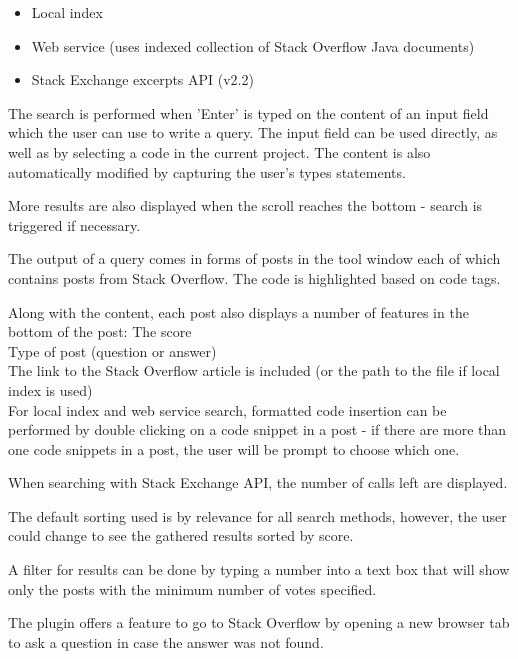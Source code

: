 \documentclass{l4proj}
\begin{document}
\begin{itemize}
\item Local index
\item Web service (uses indexed collection of Stack Overflow Java documents)
\item Stack Exchange excerpts API (v2.2)
\end{itemize}

The search is performed when 'Enter' is typed on the content of an input field which the user can use to write a query. The input field can be used directly, as well as by selecting a code in the current project. The content is also automatically modified by capturing the user's types statements.

More results are also displayed when the scroll reaches the bottom - search is triggered if necessary.

The output of a query comes in forms of posts in the tool window each of
which contains posts from Stack Overflow. The code is highlighted based on code tags.

Along with the content, each post also displays a number of features in the bottom of the post:
The score\\
Type of post (question or answer)\\
The link to the Stack Overflow article is included (or the path to the file if local index is used)\\

For local index and web service search, formatted code insertion can be performed by double clicking on a code snippet in a post - if there are more than one code snippets in a post, the user will be prompt to choose which one.

When searching with Stack Exchange API, the number of calls left are displayed.

The default sorting used is by relevance for all search methods, however, the user could change to see the gathered results sorted by score.

A filter for results can be done by typing a number into a text box that will show only the posts with the minimum number of votes specified.

The plugin offers a feature to go to Stack Overflow by opening a new browser tab to ask a question in case the answer was not found.
\end{document}
